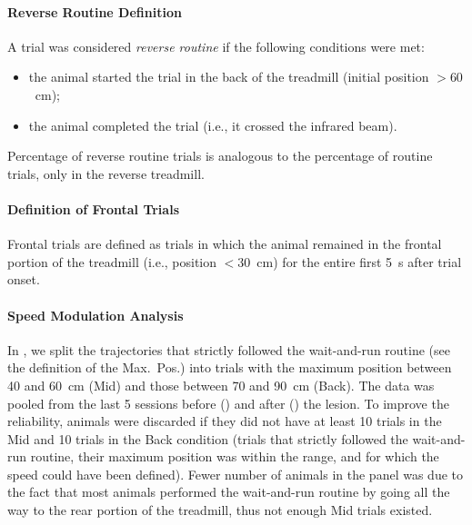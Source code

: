 \paragraph{Reverse Routine Definition}
A trial was considered \emph{reverse routine} if the following conditions were met:
\begin{itemize}[noitemsep]
    \item the animal started the trial in the back of the treadmill (initial position $> 60$~cm);
    \item the animal completed the trial (i.e., it crossed the infrared beam).
\end{itemize}
Percentage of reverse routine trials is analogous to the percentage of routine trials, only in the reverse treadmill.


\paragraph{Definition of Frontal Trials}
Frontal trials are defined as trials in which the animal remained in the frontal portion of the treadmill (i.e., position $<30$~cm) for the entire first 5~s after trial onset.


\paragraph{Speed Modulation Analysis}
In , we split the trajectories that strictly followed the wait-and-run routine (see the definition of the Max.\ Pos.) into trials with the maximum position between 40 and 60~cm (Mid) and those between 70 and 90~cm (Back).
The data was pooled from the last 5 sessions before () and after () the lesion.
To improve the reliability, animals were discarded if they did not have at least 10 trials in the Mid and 10 trials in the Back condition (trials that strictly followed the wait-and-run routine, their maximum position was within the range, and for which the speed could have been defined).
Fewer number of animals in the  panel was due to the fact that most animals performed the wait-and-run routine by going all the way to the rear portion of the treadmill, thus not enough Mid trials existed.



